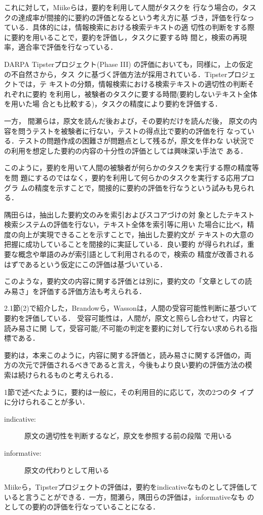これに対して，Miikeら\cite{miike:94:a}は，要約を利用して人間がタスクを
行なう場合の，タスクの達成率が間接的に要約の評価となるという考え方に基 
づき，評価を行なっている．具体的には，情報検索における検索テキストの適
切性の判断をする際に要約を用いることで，要約を評価し，タスクに要する時
間と，検索の再現率，適合率で評価を行なっている．

DARPA Tipsterプロジェクト(Phase III)
の評価\cite{hand:97:a}においても，同様に，上の仮定の不自然さから，タス
クに基づく評価方法が採用されている．Tipsterプロジェクトでは，テ
キストの分類，情報検索における検索テキストの適切性の判断それぞれに要約
を利用し，被験者のタスクに要する時間(要約しないテキスト全体を用いた場
合とも比較する)，タスクの精度により要約を評価する．

一方，
間瀬ら\cite{mase:89:a}は，原文を読んだ後および，その要約だけを読んだ後，
原文の内容を問うテストを被験者に行ない，テストの得点比で要約の評価を行
なっている．テストの問題作成の困難さが問題点として残るが，原文を伴わな
い状況での利用を想定した要約の内容の十分性の評価としては興味深い手法で
ある．

このように，要約を用いて人間の被験者が何らかのタスクを実行する際の精度等を問
題にするのではなく，要約を利用して何らかのタスクを実行する応用プログラ
ムの精度を示すことで，間接的に要約の評価を行なうという試みも見られる． 

隅田ら\cite{隅田:97:a}は，抽出した要約文のみを索引およびスコアづけの対
象としたテキスト検索システムの評価を行ない，テキスト全体を索引等に用い
た場合に比べ，精度の向上が実現できることを示すことで，抽出した要約文が
テキストの大意の把握に成功していることを間接的に実証している．良い要約
が得られれば，重要な概念や単語のみが索引語として利用されるので，検索の
精度が改善されるはずであるという仮定にこの評価は基づいている．

このような，要約文の内容に関する評価とは別に，要約文の「文章としての読
み易さ」を評価する評価方法も考えられる\cite{minel:97:a}．

2.1節(2)で紹介した，Brandowら，Wassonは，人間の受容可能性判断に基づいて
要約を評価している．
受容可能性は，人間が，原文と照らし合わせて，内容と読み易さに関
して，受容可能/不可能の判定を要約に対して行ない求められる指標である．

要約は，本来このように，内容に関する評価と，読み易さに関する評価の，両
方の次元で評価されるべきであると言え，今後もより良い要約の評価方法の模
索は続けられるものと考えられる．

1節で述べたように，要約は一般に，その利用目的に応じて，次の2つのタ
イプに分けられることが多い\cite{hand:97:a}．
\begin{description}
\item[indicative:] 原文の適切性を判断するなど，原文を参照する前の段階
で用いる
\item[informative:] 原文の代わりとして用いる
\end{description}
Miikeら，Tipsterプロジェクトの評価は，要約をindicativeなものとして評価して
いると言うことができる．一方，間瀬ら，隅田らの評価は，informativeなも
のとしての要約の評価を行なっていることになる．


